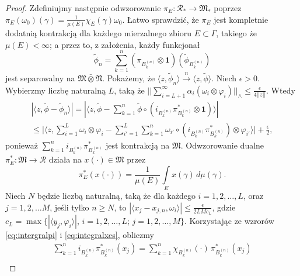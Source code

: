 \begin{proof}
Zdefiniujmy następnie odwzorowanie
$\pi_{E}: \mathcal{R}_{*} \rightarrow \mathfrak{M}_{*}$
poprzez $\pi_{E}(\omega_{0})(\gamma) =\frac{1}{\mu(E)} \chi_{E}(\gamma)\omega_{0}$.
Łatwo sprawdzić, że $\pi_{E}$ jest kompletnie dodatnią kontrakcją dla każdego
mierzalnego zbioru $E \subset \Gamma$, takiego że $\mu(E) < \infty$;
a przez to, z założenia, każdy funkcjonał
\begin{equation}
\tilde{\phi}_{n} = \sum \limits_{k=1}^{n}
(\pi_{B_{k}^{(n)}} \otimes \mathbf{1})
( \tilde{\phi}_{B_{k}^{(n)}} )
\end{equation}
jest separowalny na $\mathfrak{M} \bar{\otimes} \mathfrak{N}$.
Pokażemy, że $\langle z , \tilde{\phi}_{n} \rangle
\stackrel{n}{\rightarrow}\langle z , \tilde{\phi} \rangle$.
Niech $\epsilon > 0$.
Wybierzmy liczbę naturalną $L$, taką że
$|| \sum_{i=L+1}^{\infty}\alpha_i(\omega_{i} \otimes \varphi_{i}) ||_{\wedge}
\leq \frac{\epsilon}{4 ||z||}$.
Wtedy
\begin{eqnarray}
\label{eq:Ineq}
|\langle z, \tilde{\phi} - \tilde{\phi}_{n} \rangle| =
|\langle z, \tilde{\phi} -\sum \limits_{k=1}^{n} \tilde{\phi}
\circ (i_{B_{k}^{(n)}} \pi^{*}_{B_{k}^{(n)}} \otimes \mathbf{1})
\rangle | \nonumber\\
\leq \Big |\langle z,\sum \limits_{i=1}^{L} \omega_{i} \otimes \varphi_{i} -
\sum \limits_{i'=1}^{L}\sum \limits_{k=1}^{n}
\omega_{i'} \circ (i_{B_{k}^{(n)}} \pi^{*}_{B_{k}^{(n)}})
\otimes \varphi_{i'}
\rangle \Big | + \frac{\epsilon}{2},
\end{eqnarray}
ponieważ $\sum_{k=1}^{n} i_{B_{k}^{(n)}} \pi^{*}_{B_{k}^{(n)}}$
jest kontrakcją na $\mathfrak{M}$.
Odwzorowanie dualne
$\pi^{*}_{E}: \mathfrak{M} \rightarrow \mathcal{R}$
działa na $x(\cdot) \in \mathfrak{M}$ przez
\begin{equation}
\label{eq:intergralpi}
\pi^{*}_{E}(x(\cdot)) = \frac{1}{\mu(E)}
\int \limits_{E} x(\gamma) \, d\mu(\gamma).
\end{equation}
Niech $N$ będzie liczbą naturalną, taką że dla każdego $i = 1, 2, \ldots, L$,
oraz $j = 1,2, \ldots M$, jeśli tylko $n \geq N$,
to $|\langle x_{j} - x_{j,n}, \omega_{i} \rangle| \leq
\frac{\epsilon}{2 L M c_{L} }$, gdzie
$c_{L} = \max \{ |\langle y_{j}, \varphi_{i} \rangle |$,
$i = 1,2, \ldots, L$; $j = 1,2, \ldots, M \}$.
Korzystając ze wzrorów \eqref{eq:intergralpi} i \eqref{eq:integralxes},
obliczmy
\begin{eqnarray}
\sum \limits_{k=1}^{n} i_{B_{k}^{(n)}} \pi^{*}_{B_{k}^{(n)}} (x_{j})
=\sum \limits_{k=1}^{n} \chi_{B_{k}^{(n)}}(\cdot) \,
\pi^{*}_{B_{k}^{(n)}} (x_{j}) \nonumber\\

\end{eqnarray}
\end{proof}
